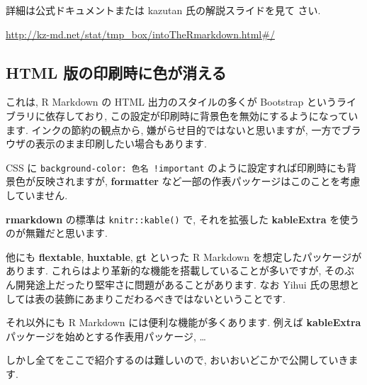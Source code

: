 \documentclass[
]{bxjsarticle}
\begin{document}
詳細は公式ドキュメントまたは kazutan 氏の解説スライドを見て
さい.

\url{http://kz-md.net/stat/tmp_box/intoTheRmarkdown.html\#/}

\hypertarget{html-ux7248ux306eux5370ux5237ux6642ux306bux8272ux304cux6d88ux3048ux308b}{%
\subsection{HTML 版の印刷時に色が消える}\label{html-ux7248ux306eux5370ux5237ux6642ux306bux8272ux304cux6d88ux3048ux308b}}

これは, R Markdown の HTML 出力のスタイルの多くが Bootstrap というライブラリに依存しており, この設定が印刷時に背景色を無効にするようになっています. インクの節約の観点から, 嫌がらせ目的ではないと思いますが, 一方でブラウザの表示のまま印刷したい場合もあります.

CSS に \texttt{background-color:\ 色名\ !important} のように設定すれば印刷時にも背景色が反映されますが, \textbf{formatter} など一部の作表パッケージはこのことを考慮していません.

\textbf{rmarkdown} の標準は \texttt{knitr::kable()} で, それを拡張した \textbf{kableExtra} を使うのが無難だと思います.

他にも \textbf{flextable}, \textbf{huxtable}, \textbf{gt} といった R Markdown を想定したパッケージがあります. これらはより革新的な機能を搭載していることが多いですが, そのぶん開発途上だったり堅牢さに問題があることがあります. なお Yihui 氏の思想としては表の装飾にあまりこだわるべきではないということです.

それ以外にも R Markdown には便利な機能が多くあります. 例えば \textbf{kableExtra} パッケージを始めとする作表用パッケージ, \ldots{}

しかし全てをここで紹介するのは難しいので, おいおいどこかで公開していきます.



\printbibliography[title=参考文献,heading=bibintoc]
\end{document}
